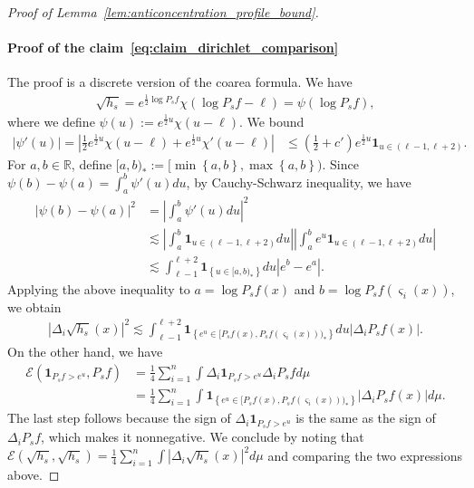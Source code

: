 \documentclass[11pt]{article}
\newcommand{\flip}{\varsigma}
\newcommand{\dirichlet}{\mathcal{E}}
\theoremstyle{named}
\theoremstyle{plain}
\newcommand{\defn}{:=}
\newcommand{\real}{\ensuremath{\mathbb{R}}}
\newcommand{\parenth}[1]{\left( #1 \right)}
\newcommand{\braces}[1]{\left\{ #1 \right \}}
\newcommand{\abss}[1]{\left| #1 \right |}
\begin{document}
\begin{proof}[Proof of Lemma~\ref{lem:anticoncentration_profile_bound}]
  \paragraph{Proof of the claim~\eqref{eq:claim_dirichlet_comparison}} The proof is a discrete version of the coarea formula. We have
  \begin{align*}
    \sqrt{h_s} = e^{\frac12 \log P_s f} \chi(\log P_s f - \ell) = \psi(\log P_s f),
  \end{align*}
  where we define $\psi(u) \defn e^{\frac12 u} \chi(u - \ell)$. We bound
  \begin{align*}
    \abss{\psi'(u)} = \abss{\frac12 e^{\frac12 u} \chi(u - \ell) + e^{\frac12 u} \chi'(u - \ell)} &\leq \parenth{\frac12 + c'} e^{\frac12 u} \mathbf{1}_{u \in (\ell - 1, \ell + 2)}.
  \end{align*}
  For $a, b \in \real$, define $[a, b)_* \defn [\min\braces{a, b}, \max\braces{a, b})$. Since $\psi(b) - \psi(a) = \int_a^b \psi'(u) du$, by Cauchy-Schwarz inequality, we have
  \begin{align*}
    \abss{\psi(b) - \psi(a)}^2 &= \abss{\int_a^b \psi'(u) du}^2 \\
    &\lesssim \abss{\int_a^b \mathbf{1}_{u \in (\ell - 1, \ell + 2)} du} \abss{\int_a^b e^{u} \mathbf{1}_{u \in (\ell - 1, \ell + 2)} du} \\
    &\lesssim \int_{\ell-1}^{\ell+2} \mathbf{1}_{\braces{u \in [a, b)_*} } du  \abss{e^b - e^a}.
  \end{align*}
  Applying the above inequality to $a = \log P_s f(x)$ and $b = \log P_s f(\flip_i (x))$, we obtain
  \begin{align*}
    \abss{\Delta_i \sqrt{h_s}(x)}^2 \lesssim \int_{\ell-1}^{\ell+2} \mathbf{1}_{\braces{e^u \in [P_s f(x), P_s f(\flip_i (x)))_*} } du \abss{\Delta_i P_s f(x)}.
  \end{align*}
  On the other hand, we have
  \begin{align*}
    \dirichlet(\mathbf{1}_{P_s f > e^{u}}, P_s f) & = \frac14 \sum_{i=1}^n \int \Delta_i \mathbf{1}_{P_s f > e^{u}} \Delta_i P_s f d\mu \\
    &= \frac14 \sum_{i=1}^n \int \mathbf{1}_{\braces{e^u \in [P_s f(x), P_s f(\flip_i (x)))_* }}  |\Delta_i P_s f(x)| d\mu.
  \end{align*}
  The last step follows because the sign of $\Delta_i \mathbf{1}_{P_s f > e^{u}}$ is the same as the sign of $\Delta_i P_s f$, which makes it nonnegative. We conclude by noting that $\dirichlet(\sqrt{h_s}, \sqrt{h_s}) = \frac14 \sum_{i=1}^n \int |\Delta_i \sqrt{h_s}(x)|^2 d\mu$ and comparing the two expressions above.
\end{proof}
\end{document}
